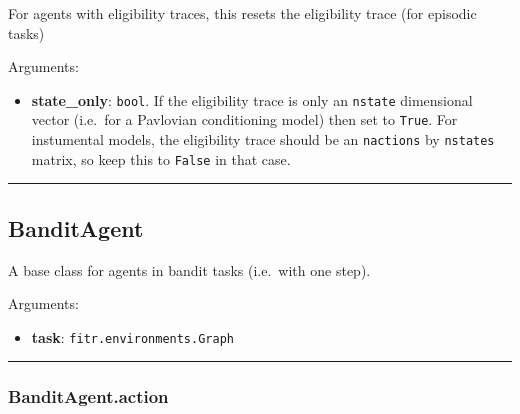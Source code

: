 \begin{Shaded}
\begin{Highlighting}[]
\OperatorTok{=}\NormalTok{)}
\end{Highlighting}
\end{Shaded}

For agents with eligibility traces, this resets the eligibility trace
(for episodic tasks)

Arguments:

\begin{itemize}
\tightlist
\item
  \textbf{state\_only}: \texttt{bool}. If the eligibility trace is only
  an \texttt{nstate} dimensional vector (i.e.~for a Pavlovian
  conditioning model) then set to \texttt{True}. For instumental models,
  the eligibility trace should be an \texttt{nactions} by
  \texttt{nstates} matrix, so keep this to \texttt{False} in that case.
\end{itemize}

\begin{center}\rule{0.5\linewidth}{\linethickness}\end{center}

\subsection{BanditAgent}\label{banditagent}

\begin{Shaded}
\begin{Highlighting}[]
\end{Highlighting}
\end{Shaded}

A base class for agents in bandit tasks (i.e.~with one step).

Arguments:

\begin{itemize}
\tightlist
\item
  \textbf{task}: \texttt{fitr.environments.Graph}
\end{itemize}

\begin{center}\rule{0.5\linewidth}{\linethickness}\end{center}

\subsubsection{BanditAgent.action}\label{banditagent.action}

